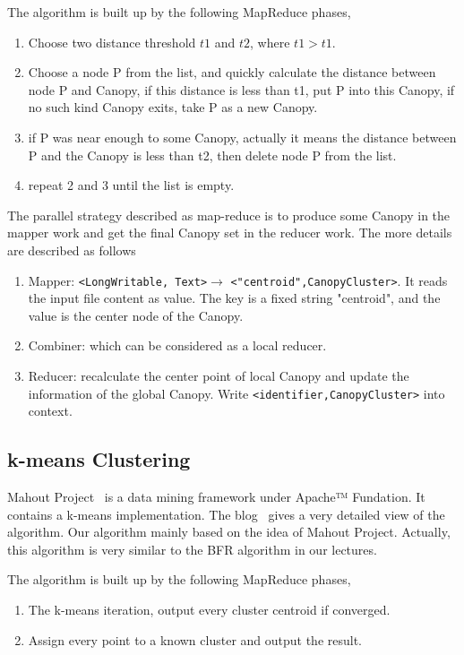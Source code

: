 \documentclass[a4paper,11pt]{article}
\begin{document}
The algorithm is built up by the following MapReduce phases,
\begin{enumerate}
  \item Choose two distance threshold $t1$ and $t2$, where $t1>t1$.	
  \item Choose a node P from the list, and quickly calculate the distance
  between node P and Canopy, if this distance is less than t1, put P into this
  Canopy, if no such kind Canopy exits, take P as a new Canopy.
  \item if P was near enough to some Canopy, actually it means the distance
  between P and the Canopy is less than t2, then delete node P from the list.
  \item repeat 2 and 3 until the list is empty.
\end{enumerate}
The parallel strategy described as map-reduce is to produce some Canopy in the
mapper work and get the final Canopy set in the reducer work. The more details
are described as follows

\begin{enumerate}
    \item Mapper: \verb|<LongWritable, Text>|$\rightarrow$
    \verb|<"centroid",CanopyCluster>|. It reads the input file content as
    value. The key is a fixed string "centroid", and the value is the center
    node of the Canopy.
    \item Combiner: which can be considered as a local reducer.
    \item Reducer: recalculate the center point of local Canopy and update the
    information of the global Canopy. Write \verb|<identifier,CanopyCluster>| into context.
\end{enumerate}

\subsection{k-means Clustering}
Mahout Project~\cite{apache:mahout} is a data mining framework under Apache™
Fundation. It contains a k-means implementation. The blog~\cite{algo:kmeans3}
gives a very detailed view of the algorithm. Our algorithm mainly based on the
idea of Mahout Project. Actually, this algorithm is very similar to the BFR
algorithm in our lectures.

The algorithm is built up by the following MapReduce phases,
\begin{enumerate}
  \item The k-means iteration, output every cluster centroid if
  converged.  	
  \item Assign every point to a known cluster and output the result.
\end{enumerate}
\end{document}
